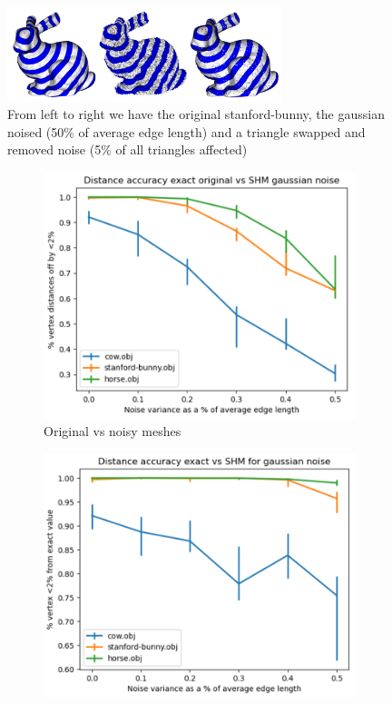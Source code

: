 \documentclass[sigconf]{acmart}
\begin{document}
\begin{figure}
  \centering
  \includegraphics[width=8cm]{all_bunnies.png}
  \caption{From left to right we have the original stanford-bunny, the gaussian noised (50\% of average edge length) and a triangle swapped and removed noise (5\% of all triangles affected)}
  \label{fig:all_bunnies}
  \Description{}
\end{figure}

\begin{figure}[htbp]
  \centering
  \hfill
  \begin{subfigure}[b]{0.23\textwidth}
    \centering
    \includegraphics[width=\textwidth]{original_vs_noisy.png}
    \caption{Original vs noisy meshes}
    \label{fig:original_vs_noisy}
  \end{subfigure}
  \begin{subfigure}[b]{0.23\textwidth}
    \centering
    \includegraphics[width=\textwidth]{noisy_vs_noisy.png}

\end{subfigure}
\end{figure}
\end{document}
